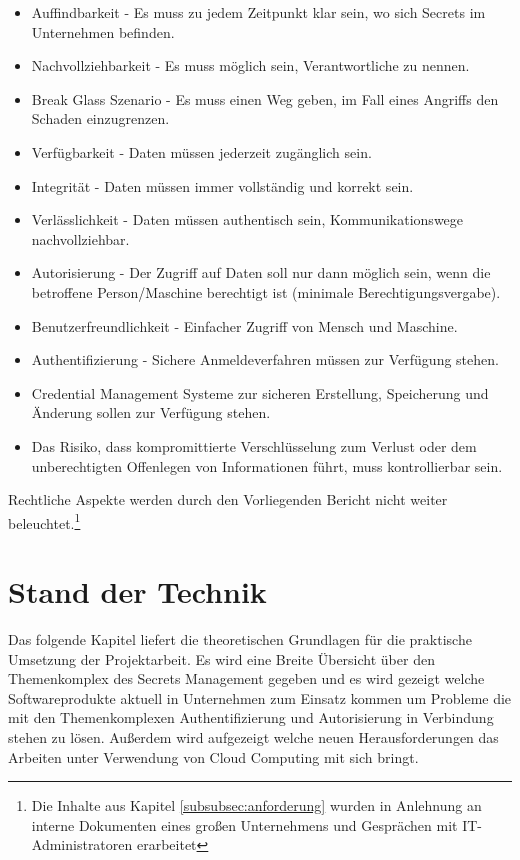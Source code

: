 \documentclass[
book,
a4paper,   
titlepage,  
halfparskip,
12pt        
]{scrartcl}
\begin{document}
\begin{onehalfspacing}
\begin{itemize}
  \item Auffindbarkeit - Es muss zu jedem Zeitpunkt klar sein, wo sich Secrets im Unternehmen befinden.
  \item Nachvollziehbarkeit - Es muss möglich sein, Verantwortliche zu nennen.
  \item Break Glass Szenario - Es muss einen Weg geben, im Fall eines Angriffs den Schaden einzugrenzen.
  \item Verfügbarkeit - Daten müssen jederzeit zugänglich sein.
  \item Integrität - Daten müssen immer vollständig und korrekt sein.
  \item Verlässlichkeit - Daten müssen authentisch sein, Kommunikationswege nachvollziehbar.
  \item Autorisierung - Der Zugriff auf Daten soll nur dann möglich sein, wenn die betroffene Person/Maschine berechtigt ist (minimale Berechtigungsvergabe).
  \item Benutzerfreundlichkeit - Einfacher Zugriff von Mensch und Maschine.
  \item Authentifizierung - Sichere Anmeldeverfahren müssen zur Verfügung stehen.
  \item Credential Management Systeme zur sicheren Erstellung, Speicherung und Änderung sollen zur Verfügung stehen.
  \item Das Risiko, dass kompromittierte Verschlüsselung zum Verlust oder dem unberechtigten Offenlegen von Informationen führt, muss kontrollierbar sein.
\end{itemize}

Rechtliche Aspekte werden durch den Vorliegenden Bericht nicht weiter beleuchtet.\footnote{Die Inhalte aus Kapitel \vref{subsubsec:anforderung} wurden in Anlehnung an interne Dokumenten eines großen Unternehmens und Gesprächen mit \ac{IT}-Administratoren erarbeitet}
\newpage
\section{Stand der Technik}
Das folgende Kapitel liefert die theoretischen Grundlagen für die praktische Umsetzung der Projektarbeit. Es wird eine Breite Übersicht über den Themenkomplex des Secrets Management gegeben und es wird gezeigt welche Softwareprodukte aktuell in Unternehmen zum Einsatz kommen um Probleme die mit den Themenkomplexen Authentifizierung und Autorisierung in Verbindung stehen zu lösen. Außerdem wird aufgezeigt welche neuen Herausforderungen das Arbeiten unter Verwendung von Cloud Computing mit sich bringt. 


\end{onehalfspacing}
\end{document}
